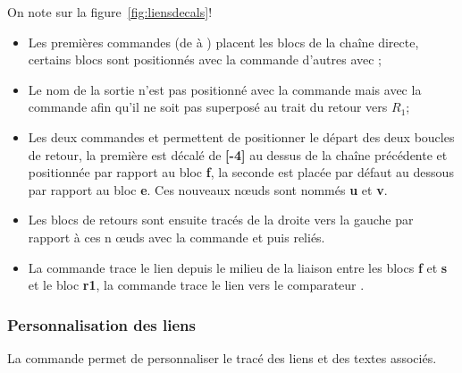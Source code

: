 \documentclass[a4paper,11pt]{article}                      %
\begin{document}
On note sur la figure~\ref{fig:liensdecals}!
\begin{itemize}
    \item Les premières commandes (de   à ) placent les blocs de la chaîne directe, certains blocs sont positionnés avec la commande \myverb{\sbBloc}  d'autres avec \myverb{\sbBlocL};
    \item Le nom de la sortie n'est pas positionné avec la commande   mais avec la commande  afin qu'il ne soit pas superposé au trait du retour vers $R_1$;
    \item Les deux commandes  et   permettent de positionner le départ des deux boucles de retour, la première est décalé de \textbf{[-4]} au dessus de la chaîne précédente et positionnée par rapport au bloc \textbf{f}, la seconde est placée par défaut au dessous par rapport au bloc \textbf{e}. Ces nouveaux n\oe uds sont nommés \textbf{u} et \textbf{v}.
    \item Les blocs de retours sont ensuite tracés de la droite vers la gauche par rapport à ces n \oe uds avec la commande  et   puis reliés.
    \item La commande    trace le lien depuis le milieu de la liaison entre les blocs \textbf{f} et \textbf{s} et le bloc \textbf{r1}, la commande    trace le lien vers le comparateur .
\end{itemize}






\subsubsection{Personnalisation des liens}

La commande   permet de personnaliser le tracé des liens et des textes associés.



\begin{tikzexample}[title=,   righthand width=0.5\textwidth,]
\end{tikzexample}
\end{document}
